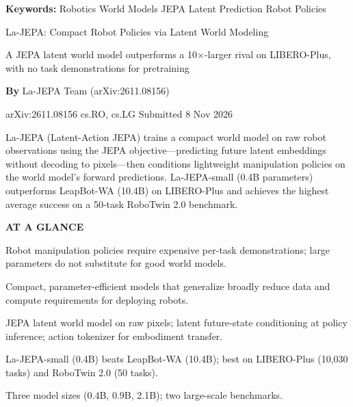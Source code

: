 \documentclass[10pt,twocolumn]{article}
\begin{document}
\setlength{\parindent}{0pt}
\setlength{\parskip}{4pt}

{\small\color{keywordgray}\textbf{Keywords:}
  Robotics \textbullet{} World Models \textbullet{} JEPA \textbullet{} Latent Prediction \textbullet{} Robot Policies}\par\vspace{4pt}

{\LARGE\bfseries\raggedright La-JEPA: Compact Robot Policies via Latent World Modeling}\par\vspace{4pt}
{\large\itshape\raggedright A JEPA latent world model outperforms a 10$\times$-larger rival on LIBERO-Plus, with no task demonstrations for pretraining}\par\vspace{6pt}
{\small\textbf{By} La-JEPA Team (arXiv:2611.08156)}\par\vspace{2pt}
{\small\color{keywordgray}arXiv:2611.08156 \textbullet{} cs.RO, cs.LG \textbullet{} Submitted 8 Nov 2026}
\par\vspace{2pt}\noindent{\color{rulered}\rule{\columnwidth}{0.6pt}}\vspace{6pt}

La-JEPA (Latent-Action JEPA) trains a compact world model on raw robot observations using the JEPA objective---predicting future latent embeddings without decoding to pixels---then conditions lightweight manipulation policies on the world model's forward predictions.
La-JEPA-small (0.4B parameters) outperforms LeapBot-WA (10.4B) on LIBERO-Plus and achieves the highest average success on a 50-task RoboTwin 2.0 benchmark.

\begin{mdframed}[backgroundcolor=boxgray,linecolor=rulered,linewidth=1pt,
    innerleftmargin=6pt,innerrightmargin=6pt,
    innertopmargin=6pt,innerbottommargin=6pt]
\textbf{\small AT A GLANCE}\par\vspace{4pt}
\begin{description}[leftmargin=0pt,labelsep=4pt,itemsep=2pt,parsep=0pt,
    font=\small\bfseries]
  \item[Problem:] Robot manipulation policies require expensive per-task demonstrations; large parameters do not substitute for good world models.
  \item[Why it matters:] Compact, parameter-efficient models that generalize broadly reduce data and compute requirements for deploying robots.
  \item[Method:] JEPA latent world model on raw pixels; latent future-state conditioning at policy inference; action tokenizer for embodiment transfer.
  \item[Result:] La-JEPA-small (0.4B) beats LeapBot-WA (10.4B); best on LIBERO-Plus (10,030 tasks) and RoboTwin 2.0 (50 tasks).
  \item[Evidence:] Three model sizes (0.4B, 0.9B, 2.1B); two large-scale benchmarks.
\end{description}
\end{mdframed}
\end{document}
